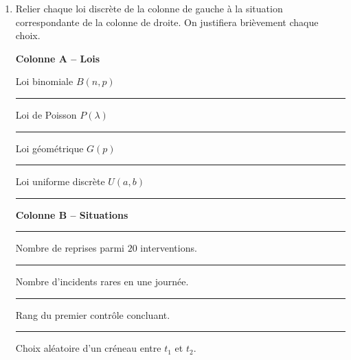 \begin{enumerate}
    \item Relier chaque loi discr\`ete de la colonne de gauche \`a la situation correspondante de la colonne de droite. On justifiera bri\`evement chaque choix.
    
    \medskip
    \noindent
    \begin{minipage}[t]{0.33\textwidth}
    \textbf{Colonne A -- Lois}\vspace{1em}
    
    Loi binomiale $B(n, p)$ \hfill \rule{1.2ex}{1.2ex}
    
    \medskip
    Loi de Poisson $P(\lambda)$ \hfill \rule{1.2ex}{1.2ex}
    
    \medskip
    Loi g\'eom\'etrique $G(p)$ \hfill \rule{1.2ex}{1.2ex}
    
    \medskip
    Loi uniforme discr\`ete $U(a, b)$ \hfill \rule{1.2ex}{1.2ex}
    \end{minipage}
    \hspace{0.14\textwidth}
    \begin{minipage}[t]{0.43\textwidth}
    \textbf{Colonne B -- Situations}\vspace{1em}
    
    \rule{1.2ex}{1.2ex}\quad Nombre de reprises parmi $20$ interventions.
    
    \medskip
    \rule{1.2ex}{1.2ex}\quad Nombre d'incidents rares en une journ\'ee.
    
    \medskip
    \rule{1.2ex}{1.2ex}\quad Rang du premier contr\^ole concluant.
    
    \medskip
    \rule{1.2ex}{1.2ex}\quad Choix al\'eatoire d'un cr\'eneau entre $t_1$ et $t_2$.
    \end{minipage}
    
    \vspace{2em}


\end{enumerate}
